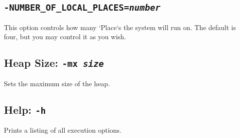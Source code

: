 \subsection{{\tt -NUMBER\_OF\_LOCAL\_PLACES={\em number}}}

This option controls how many \xcd`Place`s the system will run on.  The
default is four, but you may control it as you wish.

\subsection{Heap Size: {\tt -mx {\em size}}}

Sets the maximum size of the heap. 

\subsection{Help: {\tt -h}}

Prints a listing of all execution options.



